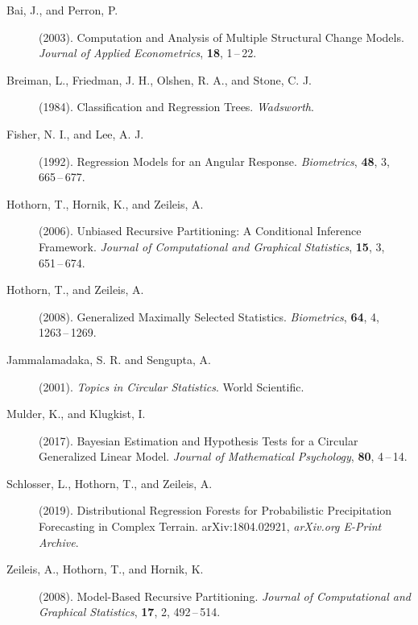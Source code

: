 \documentclass[twoside]{report}
\begin{document}
\begin{description}

\item[Bai, J., and Perron, P.] (2003).
     Computation and Analysis of Multiple Structural Change Models.
     {\it Journal of Applied Econometrics}, {\bf 18},
     1\,--\,22.     
     
\item[Breiman, L., Friedman, J. H., Olshen, R. A., and Stone, C. J.] (1984).
     Classification and Regression Trees.
     {\it Wadsworth}.

\item[Fisher, N. I., and Lee, A. J.] (1992).
     Regression Models for an Angular Response.
     {\it Biometrics}, {\bf 48}, 3,
     665\,--\,677.  

\item[Hothorn, T., Hornik, K., and Zeileis, A.] (2006).
     Unbiased Recursive Partitioning: A Conditional Inference Framework.
     {\it Journal of Computational and Graphical Statistics}, {\bf 15}, 3,
     651\,--\,674. 
     
\item[Hothorn, T., and Zeileis, A.] (2008).
     Generalized Maximally Selected Statistics.
     {\it Biometrics}, {\bf 64}, 4,
     1263\,--\,1269. 

\item[Jammalamadaka, S. R. and Sengupta, A.] (2001).
     {\it Topics in Circular Statistics}.
     World Scientific. 

\item[Mulder, K., and Klugkist, I.] (2017).
     Bayesian Estimation and Hypothesis Tests for a Circular Generalized Linear Model.
     {\it Journal of Mathematical Psychology}, {\bf 80},
     4\,--\,14. 



\item[Schlosser, L., Hothorn, T., and Zeileis, A.] (2019).
     Distributional Regression Forests for Probabilistic Precipitation Forecasting in Complex Terrain.
     arXiv:1804.02921, {\it arXiv.org E-Print Archive}.

\item[Zeileis, A., Hothorn, T., and Hornik, K.] (2008).
     Model-Based Recursive Partitioning.
     {\it Journal of Computational and Graphical Statistics}, {\bf 17}, 2,
     492\,--\,514. 
     
\end{description}
\end{document}
